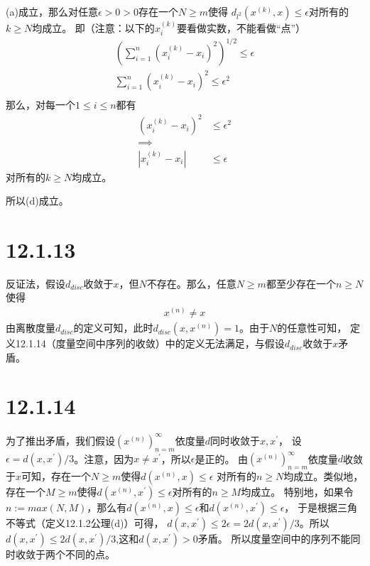 \documentclass{article}
\begin{document}
\begin{itemize}
            (a)成立，那么对任意$\epsilon > 0 > 0$存在一个$N \geq m$使得
            $d_{l^2}(x^{(k)}, x) \leq \epsilon$对所有的$k \geq N$均成立。
            即（注意：以下的$x_i^{(k)}$要看做实数，不能看做“点”）
            \begin{align*}
                  \left( \sum \limits_{i = 1}^n (x_i^{(k)} - x_i)^2 \right)^{1/2} \leq \epsilon \\
                  \sum \limits_{i = 1}^n (x_i^{(k)} - x_i)^2 \leq \epsilon^2                    \\
            \end{align*}
            那么，对每一个$1 \leq i \leq n$都有
            \begin{align*}
                  (x_i^{(k)} - x_i)^2 & \leq \epsilon^2 \\
                  \implies                              \\
                  |x_i^{(k)} - x_i|   & \leq \epsilon
            \end{align*}
            对所有的$k \geq N$均成立。

            所以(d)成立。

\end{itemize}

\section*{12.1.13}

反证法，假设$d_{disc}$收敛于$x$，但$N$不存在。那么，任意$N \geq m$都至少存在一个$n \geq N$使得
\begin{align*}
      x^{(n)} \neq x
\end{align*}
由离散度量$d_{disc}$的定义可知，此时$d_{disc}(x, x^{(n)}) = 1$。由于$N$的任意性可知，
定义12.1.14（度量空间中序列的收敛）中的定义无法满足，与假设$d_{disc}$收敛于$x$矛盾。

\section*{12.1.14}

为了推出矛盾，我们假设$(x^{(n)})_{n = m}^\infty$依度量$d$同时收敛于$x, x^\prime$，
设$\epsilon = d(x, x^\prime)/3$。注意，因为$x \neq x^\prime$，所以$\epsilon$是正的。
由$(x^{(n)})_{n = m}^\infty$依度量$d$收敛于$x$可知，存在一个$N \geq m$使得$d(x^{(n)}, x) \leq \epsilon$
对所有的$n \geq N$均成立。类似地，存在一个$M \geq m$使得$d(x^{(n)}, x^\prime) \leq \epsilon$对所有的$n \geq M$均成立。
特别地，如果令$n := max(N, M)$，那么有$d(x^{(n)}, x) \leq \epsilon$和$d(x^{(n)}, x^\prime) \leq \epsilon$，
于是根据三角不等式（定义12.1.2公理(d)）可得，
$d(x, x^\prime) \leq 2\epsilon = 2d(x, x^\prime)/3$。所以$d(x, x^\prime) \leq 2d(x, x^\prime)/3$,这和$d(x, x^\prime) > 0$矛盾。
所以度量空间中的序列不能同时收敛于两个不同的点。
\end{document}
